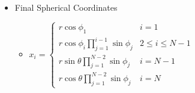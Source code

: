 \begin{itemize}
\begin{itemize}
\begin{itemize}
		$\Rightarrow$ define $\theta \in [0,2\pi)$ instead of $\phi_{N-1}, \phi_N\in[0,\pi]$ \\
		$\displaystyle \Rightarrow x_{N-1} = r_{N-1}\sin\theta, x_{N} = r_{N-1}\cos\theta$ (interchangeable)
		\end{itemize}
	\item Final Spherical Coordinates
		\begin{itemize}
		\item $x_i = \begin{cases} r\cos\phi_1 & i = 1 \\ \displaystyle r\cos\phi_i\prod_{j=1}^{i-1}\sin\phi_j & 2\le i \le N-1 \\ \displaystyle r\sin\theta\prod_{j=1}^{N-2}\sin\phi_j & i=N-1 \\ \displaystyle r\cos\theta\prod_{j=1}^{N-2}\sin\phi_j & i=N \end{cases}$
		\end{itemize}
	\end{itemize}
\end{itemize}


